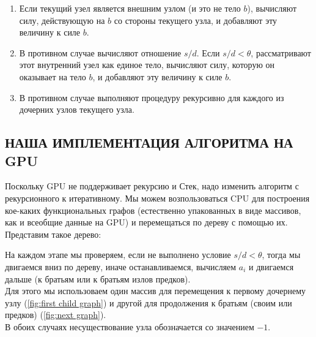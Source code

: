 \documentclass{article}
\renewcommand{\baselinestretch}{1.5}
\begin{document}
\begin{enumerate}[label=\Alph*)]
\item Если текущий узел является внешним узлом (и это не тело $b$), вычисляют силу, действующую на $b$ со стороны текущего узла, и добавляют эту величину к силе $b$.
\item В противном случае вычисляют отношение $s/d$. Если $s/d < \theta$, рассматривают этот внутренний узел как единое тело, вычисляют силу, которую он оказывает на тело $b$, и добавляют эту величину к силе $b$.
\item В противном случае выполняют процедуру рекурсивно для каждого из дочерних узлов текущего узла.
\end{enumerate}

\vspace{2\baselinestretch pt}
\subsection{НАША ИМПЛЕМЕНТАЦИЯ АЛГОРИТМА НА GPU}
Поскольку GPU не поддерживает рекурсию и Стек, надо изменить алгоритм с рекурсионного к итеративному.
Мы можем возпользоваться CPU для построения кое-каких функциональных графов (естественно упакованных в виде массивов, как и всеобщие данные на GPU) и перемещаться по дереву с помощью их.
Представим такое дерево:
\begin{figure}[H]
  \centering
\end{figure}
На каждом этапе мы проверяем, если не выполнено условие $s/d < \theta$, тогда мы двигаемся вниз по дереву, иначе останавливаемся, вычисляем $a_i$ и двигаемся дальше (к братьям или к братьям излов предков).\\
Для этого мы использоваем один массив для перемещения к первому дочернему узлу (\ref{fig:first child graph}) и другой для продолжения к братьям (своим или предков) (\ref{fig:next graph}).\\
В обоих случаях несуществование узла обозначается со значением $-1$.
\end{document}

